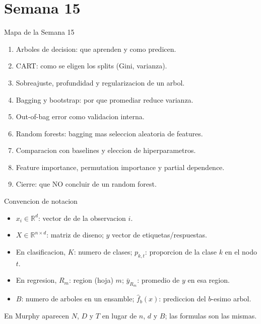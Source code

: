 \part{Semana 15}

\begin{frame}
  \titlepage
\end{frame}

\begin{frame}{Mapa de la Semana 15}
\begin{enumerate}\small
  \item Arboles de decision: que aprenden y como predicen.
  \item CART: como se eligen los splits (Gini, varianza).
  \item Sobreajuste, profundidad y regularizacion de un arbol.
  \item Bagging y bootstrap: por que promediar reduce varianza.
  \item Out-of-bag error como validacion interna.
  \item Random forests: bagging mas seleccion aleatoria de features.
  \item Comparacion con baselines y eleccion de hiperparametros.
  \item Feature importance, permutation importance y partial dependence.
  \item Cierre: que NO concluir de un random forest.
\end{enumerate}
\end{frame}

\begin{frame}{Convencion de notacion}
\begin{itemize}\small
  \item $x_i\in\mathbb{R}^d$: vector de  de la observacion $i$.
  \item $X\in\mathbb{R}^{n\times d}$: matriz de diseno; $y$ vector de etiquetas/respuestas.
  \item En clasificacion, $K$: numero de clases; $p_{k,t}$: proporcion de la clase $k$ en el nodo $t$.
  \item En regresion, $R_m$: region (hoja) $m$; $\bar{y}_{R_m}$: promedio de $y$ en esa region.
  \item $B$: numero de arboles en un ensamble; $\hat f_b(x)$: prediccion del $b$-esimo arbol.
\end{itemize}
\vspace{0.25em}
{\footnotesize En Murphy aparecen $N$, $D$ y $T$ en lugar de $n$, $d$ y $B$; las formulas son las mismas.}
\end{frame}

